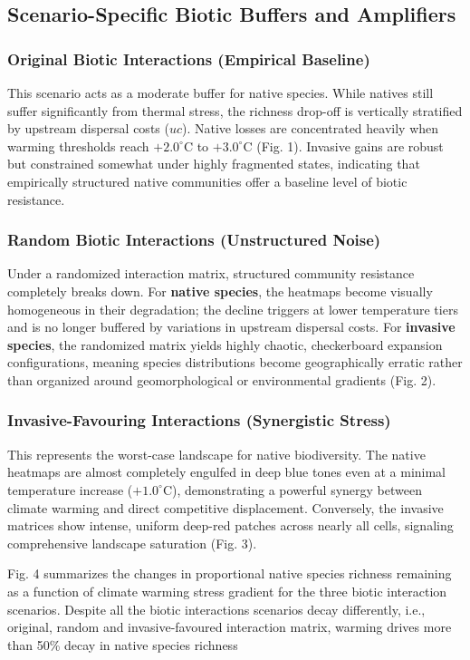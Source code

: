 \documentclass[11pt,a4paper]{article}
\begin{document}
{\subsection{Scenario-Specific Biotic Buffers and Amplifiers}

\subsubsection{Original Biotic Interactions (Empirical Baseline)}
This scenario acts as a moderate buffer for native species. While natives still suffer significantly from thermal stress, the richness drop-off is vertically stratified by upstream dispersal costs ($uc$). Native losses are concentrated heavily when warming thresholds reach $+2.0^\circ\text{C}$ to $+3.0^\circ\text{C}$ (Fig. 1). Invasive gains are robust but constrained somewhat under highly fragmented states, indicating that empirically structured native communities offer a baseline level of biotic resistance.

\subsubsection{Random Biotic Interactions (Unstructured Noise)}
Under a randomized interaction matrix, structured community resistance completely breaks down. For \textbf{native species}, the heatmaps become visually homogeneous in their degradation; the decline triggers at lower temperature tiers and is no longer buffered by variations in upstream dispersal costs. For \textbf{invasive species}, the randomized matrix yields highly chaotic, checkerboard expansion configurations, meaning species distributions become geographically erratic rather than organized around geomorphological or environmental gradients (Fig. 2).

\subsubsection{Invasive-Favouring Interactions (Synergistic Stress)}
This represents the worst-case landscape for native biodiversity. The native heatmaps are almost completely engulfed in deep blue tones even at a minimal temperature increase ($+1.0^\circ\text{C}$), demonstrating a powerful synergy between climate warming and direct competitive displacement. Conversely, the invasive matrices show intense, uniform deep-red patches across nearly all cells, signaling comprehensive landscape saturation (Fig. 3).

Fig. 4 summarizes the changes in proportional native species richness remaining as a function of climate warming stress gradient for the three biotic interaction scenarios. Despite all the biotic interactions scenarios decay differently, i.e., original, random and invasive-favoured interaction matrix, warming drives more than 50\% decay in native species richness 

}
\end{document}
